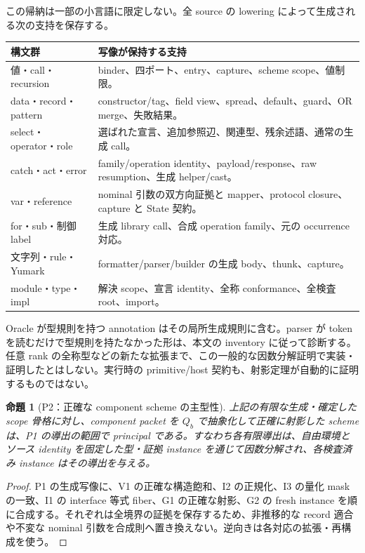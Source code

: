 \documentclass[11pt,a4paper]{article}
\newtheorem{theorem}{命題}[section]
\theoremstyle{remark}
\begin{document}
この帰納は一部の小言語に限定しない。全 source の lowering によって生成される次の支持を保存する。
\begin{center}
\begin{tabular}{p{}p{}}
\toprule
構文群 & 写像が保持する支持 \\
\midrule
値・call・recursion & binder、四ポート、entry、capture、scheme scope、値制限。\\
data・record・pattern & constructor/tag、field view、spread、default、guard、OR merge、失敗結果。\\
select・operator・role & 選ばれた宣言、追加参照辺、関連型、残余述語、通常の生成 call。\\
catch・act・error & family/operation identity、payload/response、raw resumption、生成 helper/cast。\\
var・reference & nominal 引数の双方向証拠と mapper、protocol closure、capture と State 契約。\\
for・sub・制御 label & 生成 library call、合成 operation family、元の occurrence 対応。\\
文字列・rule・Yumark & formatter/parser/builder の生成 body、thunk、capture。\\
module・type・impl & 解決 scope、宣言 identity、全称 conformance、全検査 root、import。\\
\bottomrule
\end{tabular}
\end{center}
Oracle が型規則を持つ annotation はその局所生成規則に含む。parser が token を読むだけで型規則を持たなかった形は、本文の inventory に従って診断する。任意 rank の全称型などの新たな拡張まで、この一般的な因数分解証明で実装・証明したとはしない。実行時の primitive/host 契約も、射影定理が自動的に証明するものではない。

\begin{theorem}[P2：正確な component scheme の主型性]
上記の有限な生成・確定した scope 骨格に対し、component packet を $Q_b$ で抽象化して正確に射影した scheme は、P1 の導出の範囲で principal である。すなわち各有限導出は、自由環境とソース identity を固定した型・証拠 instance を通じて因数分解され、各検査済み instance はその導出を与える。
\end{theorem}
\begin{proof}
P1 の生成写像に、V1 の正確な構造飽和、I2 の正規化、I3 の量化 mask の一致、I1 の interface 等式 fiber、G1 の正確な射影、G2 の fresh instance を順に合成する。それぞれは全境界の証拠を保存するため、非推移的な record 適合や不変な nominal 引数を合成則へ置き換えない。逆向きは各対応の拡張・再構成を使う。
\end{proof}
\end{document}
